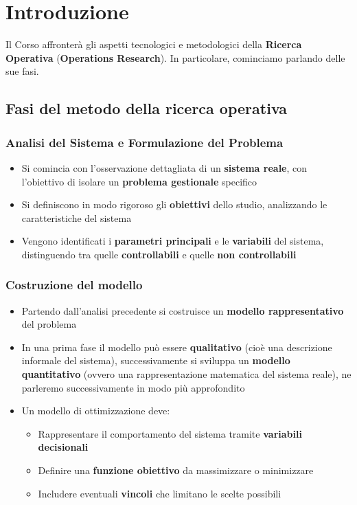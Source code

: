 
\chapter{Introduzione}
Il Corso affronterà gli aspetti tecnologici e metodologici della \textbf{Ricerca Operativa} (\textbf{Operations Research}). In particolare, cominciamo parlando delle sue fasi.

\section{Fasi del metodo della ricerca operativa}

\subsection{\textbf{Analisi del Sistema} e \textbf{Formulazione del Problema}}
\begin{itemize}
    \item Si comincia con l'osservazione dettagliata di un \textbf{sistema reale}, con l'obiettivo di isolare un \textbf{problema gestionale} specifico
    \item Si definiscono in modo rigoroso gli \textbf{obiettivi} dello studio, analizzando le caratteristiche del sistema
    \item Vengono identificati i \textbf{parametri principali} e le \textbf{variabili} del sistema, distinguendo tra quelle \textbf{controllabili} e quelle \textbf{non controllabili}
\end{itemize}

\subsection{\textbf{Costruzione del modello}}
\begin{itemize}
    \item Partendo dall'analisi precedente si costruisce un \textbf{modello rappresentativo} del problema
    \item In una prima fase il modello può essere \textbf{qualitativo} (cioè una descrizione informale del sistema), successivamente si sviluppa un \textbf{modello quantitativo} (ovvero una rappresentazione matematica del sistema reale), ne parleremo successivamente in modo più approfondito
    \item Un modello di ottimizzazione deve:
    \begin{itemize}
        \item Rappresentare il comportamento del sistema tramite \textbf{variabili decisionali}
        \item Definire una \textbf{funzione obiettivo} da massimizzare o minimizzare
        \item Includere eventuali \textbf{vincoli} che limitano le scelte possibili
    \end{itemize}
\end{itemize}

